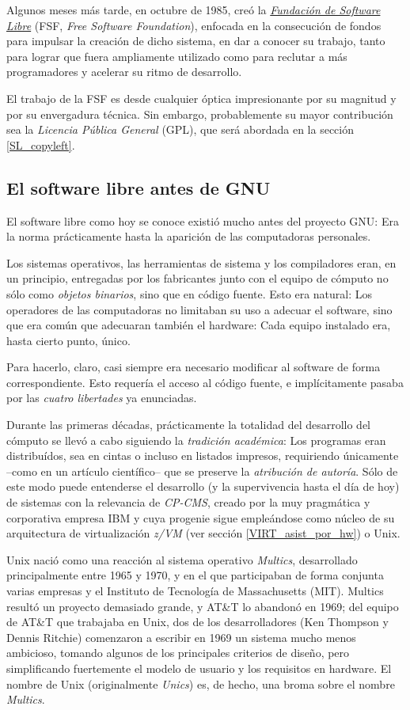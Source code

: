 \documentclass[11pt,fleqn]{book} %
\begin{document}
Algunos meses más tarde, en octubre de 1985, creó la \emph{\href{http://www.fsf.org}{Fundación de Software Libre}} (FSF, \emph{Free Software Foundation}), enfocada en la
consecución de fondos para impulsar la creación de dicho sistema, en
dar a conocer su trabajo, tanto para lograr que fuera ampliamente
utilizado como para reclutar a más programadores y acelerar su ritmo
de desarrollo.

El trabajo de la FSF es desde cualquier óptica impresionante por su
magnitud y por su envergadura técnica. Sin embargo, probablemente su
mayor contribución sea la \emph{Licencia Pública General} (GPL), que será
abordada en la sección \ref{SL_copyleft}.
\subsection{El software libre antes de GNU}
\label{sec-8-1-2}


El software libre como hoy se conoce existió mucho antes del proyecto
GNU: Era la norma prácticamente hasta la aparición de las computadoras
personales.

Los sistemas operativos, las herramientas de sistema y los
compiladores eran, en un principio, entregadas por los fabricantes
junto con el equipo de cómputo no sólo como \emph{objetos binarios}, sino
que en código fuente. Esto era natural: Los operadores de las
computadoras no limitaban su uso a adecuar el software, sino que era
común que adecuaran también el hardware: Cada equipo instalado era,
hasta cierto punto, único.

Para hacerlo, claro, casi siempre era necesario modificar al software
de forma correspondiente. Esto requería el acceso al código fuente, e
implícitamente pasaba por las \emph{cuatro libertades} ya enunciadas.

Durante las primeras décadas, prácticamente la totalidad del
desarrollo del cómputo se llevó a cabo siguiendo la \emph{tradición académica}: Los programas eran distribuídos, sea en cintas o incluso
en listados impresos, requiriendo únicamente –como en un artículo
científico– que se preserve la \emph{atribución de autoría}. Sólo de este
modo puede entenderse el desarrollo (y la supervivencia hasta el día
de hoy) de sistemas con la relevancia de \emph{CP-CMS}, creado por la muy
pragmática y corporativa empresa IBM y cuya progenie sigue empleándose
como núcleo de su arquitectura de virtualización \emph{z/VM} (ver sección
\ref{VIRT_asist_por_hw}) o Unix.

Unix nació como una reacción al sistema operativo \emph{Multics},
desarrollado principalmente entre 1965 y 1970, y en el que
participaban de forma conjunta varias empresas y el Instituto de
Tecnología de Massachusetts (MIT). Multics resultó un proyecto
demasiado grande, y AT\&T lo abandonó en 1969; del equipo de AT\&T que
trabajaba en Unix, dos de los desarrolladores (Ken Thompson y Dennis
Ritchie) comenzaron a escribir en 1969 un sistema mucho menos
ambicioso, tomando algunos de los principales criterios de diseño,
pero simplificando fuertemente el modelo de usuario y los requisitos
en hardware. El nombre de Unix (originalmente \emph{Unics}) es, de hecho,
una broma sobre el nombre \emph{Multics}.
\end{document}

